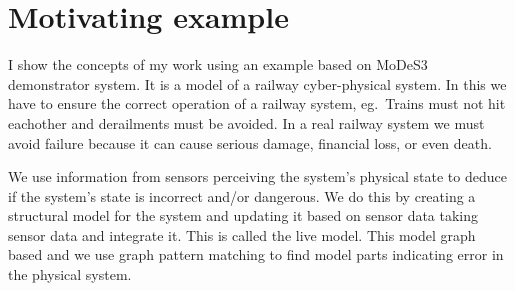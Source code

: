 \chapter{Motivating example}


I show the concepts of my work using an example based on MoDeS3~\cite{modes3} demonstrator system. It is a model of a railway cyber-physical system. In this we have to ensure the correct operation of a railway system, eg.\ Trains must not hit eachother and derailments must be avoided. In a real railway system we must avoid failure because it can cause serious damage, financial loss, or even death.

We use information from sensors perceiving the system's physical state to deduce if the system's state is incorrect and/or dangerous. We do this by creating a structural model for the system and updating it based on sensor data taking sensor data and integrate it. This is called the live model. This model graph based and we use graph pattern matching to find model parts indicating error in the physical system. 



